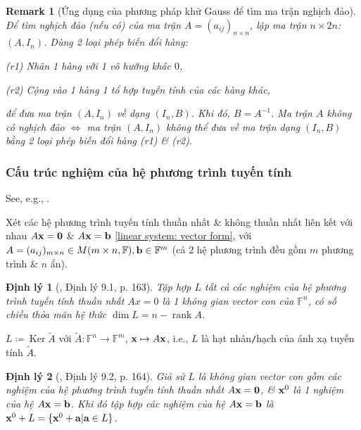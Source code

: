 \documentclass{article}
\newtheorem{dinhly}{Định lý}
\newtheorem{remark}{Remark}
\begin{document}
\begin{remark}[Ứng dụng của phương pháp khử Gauss để tìm ma trận nghịch đảo]
	Để tìm nghịch đảo (nếu có) của ma trận $A = (a_{ij})_{n\times n}$, lập ma trận $n\times2n$: $(A,I_n)$. Dùng 2 loại phép biến đổi hàng:
	\item(r1) Nhân 1 hàng với 1 vô hướng khác $0$,
	\item(r2) Cộng vào 1 hàng 1 tổ hợp tuyến tính của các hàng khác,
	
	\noindent để đưa ma trận $(A,I_n)$ về dạng $(I_n,B)$. Khi đó, $B = A^{-1}$. Ma trận $A$ không có nghịch đảo $\Leftrightarrow$ ma trận $(A,I_n)$ không thể đưa về ma trận dạng $(I_n,B)$ bằng 2 loại phép biến đổi hàng (r1) \& (r2).
\end{remark}


\subsubsection{Cấu trúc nghiệm của hệ phương trình tuyến tính}
See, e.g., \cite[Chap. 3, \S9: Cấu trúc nghiệm của hệ phương trình tuyến tính, pp. 163--165]{Hung_linear_algebra}.

Xét các hệ phương trình tuyến tính thuần nhất \& không thuần nhất liên kết với nhau $A{\bf x} = {\bf0}$ \& $A{\bf x} = {\bf b}$ \eqref{linear system: vector form}, với $A = (a_{ij})_{m\times n}\in M(m\times n,\mathbb{F}),{\bf b}\in\mathbb{F}^m$ (cả 2 hệ phương trình đều gồm $m$ phương trình \& $n$ ẩn).

\begin{dinhly}[\cite{Hung_linear_algebra}, Định lý 9.1, p. 163]
	Tập hợp $L$ tất cả các nghiệm của hệ phương trình tuyến tính thuần nhất $Ax = 0$ là 1 không gian vector con của $\mathbb{F}^n$, có số chiều thỏa mãn hệ thức $\dim L = n - \operatorname{rank}A$.
\end{dinhly}
$L\coloneqq\operatorname{Ker}\tilde{A}$ với $\tilde{A}:\mathbb{F}^n\to\mathbb{F}^m$, ${\bf x}\mapsto A{\bf x}$, i.e., $L$ là hạt nhân{\tt/}hạch của ánh xạ tuyến tính $\tilde{A}$.

\begin{dinhly}[\cite{Hung_linear_algebra}, Định lý 9.2, p. 164]
	Giả sử $L$ là không gian vector con gồm các nghiệm của hệ phương trình tuyến tính thuần nhất $A{\bf x} = {\bf0}$, \& ${\bf x}^0$ là 1 nghiệm của hệ $A{\bf x} = {\bf b}$. Khi đó tập hợp các nghiệm của hệ $A{\bf x} = {\bf b}$ là ${\bf x}^0 + L = \{{\bf x}^0 + {\bf a}|{\bf a}\in L\}$.
\end{dinhly}
\end{document}
